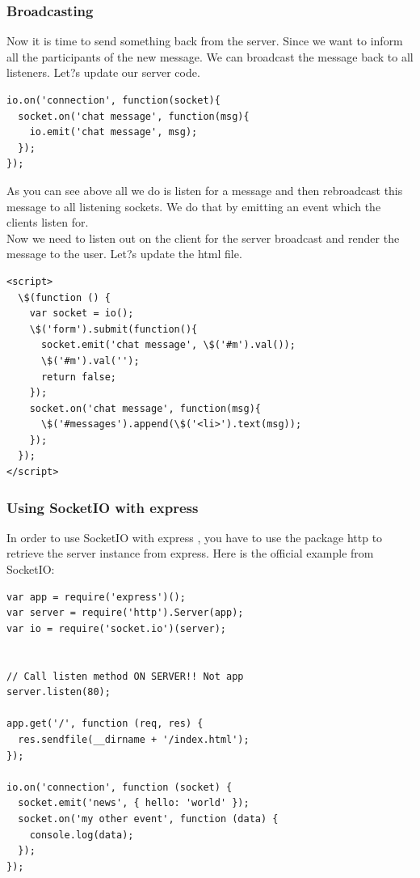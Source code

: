 \documentclass[a4paper]{article}
\begin{document}
\subsubsection{Broadcasting}
Now it is time to send something back from the server. Since we want to inform all the participants of the new message. We can broadcast the message back to all listeners. Let?s update our server code.
\begin{lstlisting}
io.on('connection', function(socket){
  socket.on('chat message', function(msg){
    io.emit('chat message', msg);
  });
});
\end{lstlisting}
As you can see above all we do is listen for a message and then rebroadcast this message to all listening sockets. We do that by emitting an event which the clients listen for.\\

Now we need to listen out on the client for the server broadcast and render the message to the user. Let?s update the html file.
\begin{lstlisting}
<script>
  \$(function () {
    var socket = io();
    \$('form').submit(function(){
      socket.emit('chat message', \$('#m').val());
      \$('#m').val('');
      return false;
    });
    socket.on('chat message', function(msg){
      \$('#messages').append(\$('<li>').text(msg));
    });
  });
</script>
\end{lstlisting}
\subsubsection{Using SocketIO with express}
In order to use SocketIO with express , you have to use the package http to retrieve the server instance from express. Here is the official example from SocketIO:
\begin{lstlisting}
var app = require('express')();
var server = require('http').Server(app);
var io = require('socket.io')(server);


// Call listen method ON SERVER!! Not app
server.listen(80);

app.get('/', function (req, res) {
  res.sendfile(__dirname + '/index.html');
});

io.on('connection', function (socket) {
  socket.emit('news', { hello: 'world' });
  socket.on('my other event', function (data) {
    console.log(data);
  });
});
\end{lstlisting}
\end{document}
